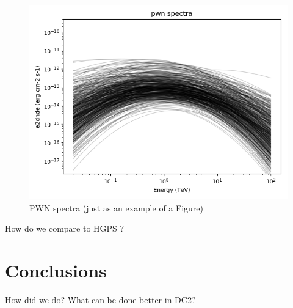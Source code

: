 \documentclass{article}
\begin{document}
\begin{figure}[t]
\begin{center}
\includegraphics[width=1.0\textwidth]
{../sky_model_checks/ctadc_skymodel_gps_sources_spectra_pwn}
\caption{PWN spectra (just as an example of a Figure)}
\label{fig:pwn_spec}
\end{center}
\end{figure}


How do we compare to HGPS \citep{2013arXiv1307.4868C}?

\section{Conclusions}

How did we do? What can be done better in DC2?





\end{document}
